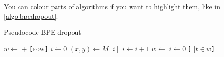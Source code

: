 You can colour parts of algorithms if you want to highlight them, like in \autoref{algo:bpedropout}.
\begin{algorithm}[H]
	\caption{Pseudocode BPE-dropout}
	\label{algo:bpedropout}
	\begin{algorithmic}[1]
			\State $w\gets$  + \texttt{[}\textsc{eow}\texttt{]}
			\State $i\gets 0$
				\State $(x,y) \gets M[i]$
				\State $i \gets i + 1$   %
					{\color{blue}
						\State $w \gets$ 
						\State $i \gets 0$
					\EndIf
					}
				\EndIf
			\EndWhile
			\Statey \Return \texttt{[} $\mid t \in w$\texttt{]}
		\EndFunction
	\end{algorithmic}
\end{algorithm}

